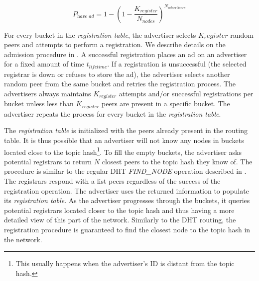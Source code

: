 \begin{equation}
    P_\textit{have ad} = 1-(1 - \frac{K_\textit{register}}{N_\textit{nodes}})^{N_\textit{advertisers}}
\end{equation}


For every bucket in the \emph{registration table}, the advertiser selects $K_register$ random peers and attempts to perform a registration. 
We describe details on the admission procedure in . 
A successful registration places an ad on an advertiser for a fixed amount of time $t_\textit{lifetime}$.
If a registration is unsuccessful (the selected registrar is down or refuses to store the ad), the advertiser selects another random peer from the same bucket and retries the registration process. 
The advertisers always maintains $K_\textit{register}$ attempts and/or successful registrations per bucket unless less than $K_\textit{register}$ peers are present in a specific bucket. 
The advertiser repeats the process for every bucket in the \emph{registration table}. 

 




The \emph{registration table} is initialized with the peers already present in the routing table. It is thus possible that an advertiser will not know any nodes in buckets located close to the topic hash\footnote{This usually happens when the advertiser's ID is distant from the topic hash.}. 
To fill the empty buckets, the advertiser asks potential registrars to return $N$ closest peers to the topic hash they know of. 
The procedure is similar to the regular DHT \emph{FIND\_NODE} operation described in . 
The registrars respond with a list peers regardless of the success of the registration operation. 
The advertiser uses the returned information to populate its \emph{registration table}. 
As the advertiser progresses through the buckets, it queries potential registrars located closer to the topic hash and thus having a more detailed view of this part of the network. 
Similarly to the DHT routing, the registration procedure is guaranteed to find the closest node to the topic hash in the network. 





